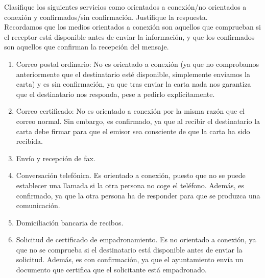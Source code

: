 \begin{ejercicio}
    Clasifique los siguientes servicios como orientados a conexión/no orientados a conexión y confirmados/sin confirmación. Justifique la respuesta.\\

    Recordamos que los medios orientados a conexión son aquellos que comprueban si el receptor está disponible antes de enviar la información, y que los confirmados son aquellos que confirman la recepción del mensaje.
    \begin{enumerate}
        \item Correo postal ordinario: No es orientado a conexión (ya que no comprobamos anteriormente que el destinatario esté disponible, simplemente enviamos la carta) y es sin confirmación, ya que tras enviar la carta nada nos garantiza que el destinatario nos responda, pese a pedirlo explícitamente.
        \item Correo certificado: No es orientado a conexión por la misma razón que el correo normal. Sin embargo, es confirmado, ya que al recibir el destinatario la carta debe firmar para que el emisor sea consciente de que la carta ha sido recibida.
        \item Envío y recepción de fax.
        \item Conversación telefónica. Es orientado a conexión, puesto que no se puede establecer una llamada si la otra persona no coge el teléfono. Además, es confirmado, ya que la otra persona ha de responder para que se produzca una comunicación.
        \item Domiciliación bancaria de recibos.
        \item Solicitud de certificado de empadronamiento. Es no orientado a conexión, ya que no se comprueba si el destinatario está disponible antes de enviar la solicitud. Además, es con confirmación, ya que el ayuntamiento envía un documento que certifica que el solicitante está empadronado.
    \end{enumerate}
\end{ejercicio}

